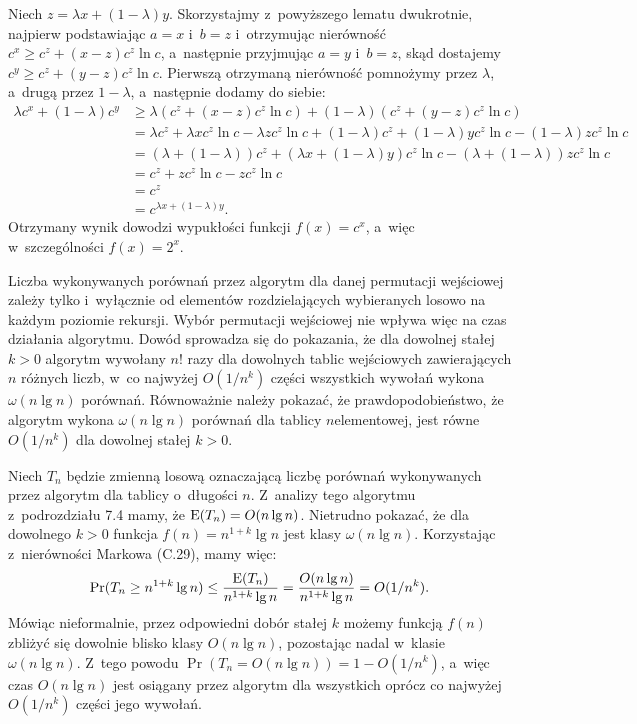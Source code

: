 Niech $z=\lambda x+(1-\lambda)y$.
Skorzystajmy z~powyższego lematu dwukrotnie, najpierw podstawiając $a=x$ i~$b=z$ i~otrzymując nierówność $c^x\ge c^z+(x-z)c^z\ln c$, a~następnie przyjmując $a=y$ i~$b=z$, skąd dostajemy $c^y\ge c^z+(y-z)c^z\ln c$.
Pierwszą otrzymaną nierówność pomnożymy przez $\lambda$, a~drugą przez $1-\lambda$, a~następnie dodamy do siebie:
\begin{align*}
	\lambda c^x+(1-\lambda)c^y &\ge \lambda(c^z+(x-z)c^z\ln c)+(1-\lambda)(c^z+(y-z)c^z\ln c) \\
	&= \lambda c^z+\lambda xc^z\ln c-\lambda zc^z\ln c+(1-\lambda)c^z+(1-\lambda)yc^z\ln c-(1-\lambda)zc^z\ln c \\
	&= (\lambda+(1-\lambda))c^z+(\lambda x+(1-\lambda)y)c^z\ln c-(\lambda+(1-\lambda))zc^z\ln c \\
	&= c^z+zc^z\ln c-zc^z\ln c \\
	&= c^z \\
	&= c^{\lambda x+(1-\lambda)y}.
\end{align*}
Otrzymany wynik dowodzi wypukłości funkcji $f(x)=c^x$, a~więc w~szczególności $f(x)=2^x$.

\exercise %

\noindent Liczba wykonywanych porównań przez algorytm  dla danej permutacji wejściowej  zależy tylko i~wyłącznie od elementów rozdzielających wybieranych losowo na każdym poziomie rekursji.
Wybór permutacji wejściowej nie wpływa więc na czas działania algorytmu.
Dowód sprowadza się do pokazania, że dla dowolnej stałej $k>0$ algorytm  wywołany $n!$ razy dla dowolnych tablic wejściowych zawierających $n$ różnych liczb, w~co najwyżej $O(1/n^k)$ części wszystkich wywołań wykona $\omega(n\lg n)$ porównań.
Równoważnie należy pokazać, że prawdopodobieństwo, że algorytm wykona $\omega(n\lg n)$ porównań dla tablicy $n$\nbhyphen elementowej, jest równe $O(1/n^k)$ dla dowolnej stałej $k>0$.

Niech $T_n$ będzie zmienną losową oznaczającą liczbę porównań wykonywanych przez algorytm  dla tablicy o~długości $n$.
Z~analizy tego algorytmu z~podrozdziału 7.4 mamy, że $\operatorname{E}(T_n)=O(n\lg n)$.
Nietrudno pokazać, że dla dowolnego $k>0$ funkcja $f(n)=n^{1+k}\lg n$ jest klasy $\omega(n\lg n)$.
Korzystając z~nierówności Markowa (C.29), mamy więc:
\[
	\Pr(T_n\ge n^{1+k}\lg n) \le \frac{\operatorname{E}(T_n)}{n^{1+k}\lg n} = \frac{O(n\lg n)}{n^{1+k}\lg n} = O(1/n^k).
\]
Mówiąc nieformalnie, przez odpowiedni dobór stałej $k$ możemy funkcją $f(n)$ zbliżyć się dowolnie blisko klasy $O(n\lg n)$, pozostając nadal w~klasie $\omega(n\lg n)$.
Z~tego powodu $\Pr(T_n=O(n\lg n))=1-O(1/n^k)$, a~więc czas $O(n\lg n)$ jest osiągany przez algorytm dla wszystkich oprócz co najwyżej $O(1/n^k)$ części jego wywołań.

